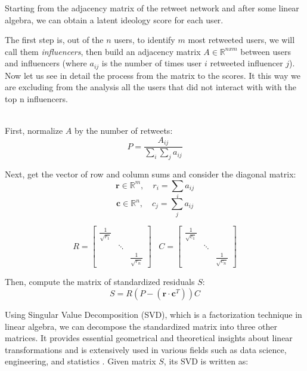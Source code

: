 Starting from the adjacency matrix of the retweet network and after some linear algebra, we can obtain a latent ideology score for each user.

The first step is, out of the $n$ users, to identify $m$ most retweeted users, we will call them \textit{influencers}, then build an adjacency matrix $A\in \mathbb{R}^{n x m}$ between users and influencers (where \(a_{ij}\) is the number of times user $i$ retweeted influencer $j$). Now let us see in detail the process from the matrix to the scores. It this way we are excluding from the analysis all the users that did not interact with with the top n influencers.

\\

First, normalize $A$ by the number of retweets:
\begin{equation}
P =  \frac{A_{ij}}{\sum_{i} \sum_{j} a_{ij}}
\end{equation}

Next, get the vector of row and column sums and consider the diagonal matrix:
\begin{equation}
\textbf{r} \in \mathbb{R}^m, \quad  r_i = \sum_{i} a_{ij}
\end{equation}
\begin{equation}
\textbf{c} \in \mathbb{R}^n , \quad c_j = \sum_{j} a_{ij} 
\end{equation}





\begin{equation}
  R =
  \begin{bmatrix}
    \frac{1}{{\sqrt{r_{1}}}} & & \\
    & \ddots & \\
    & & \frac{1}{{\sqrt{r_{n}}}}
  \end{bmatrix}
  \;\;\;  C =
  \begin{bmatrix}
    \frac{1}{{\sqrt{c_{1}}}} & & \\
    & \ddots & \\
    & & \frac{1}{{\sqrt{c_{n}}}}
  \end{bmatrix}
\end{equation}

Then, compute the matrix of standardized residuals $S$:
\begin{equation}
S = R\left(P - (\textbf{r}\cdot \textbf{c}^T)\right)C
\end{equation}

Using Singular Value Decomposition (SVD), which is a factorization technique in linear algebra, we can decompose the standardized matrix into three other matrices. It provides essential geometrical and theoretical insights about linear transformations and is extensively used in various fields such as data science, engineering, and statistics \cite{golub1970singular}. Given  matrix $S$, its SVD is  written as:

